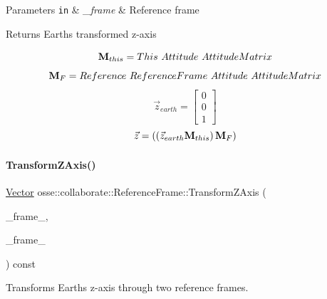 \begin{DoxyParams}[1]{Parameters}
\mbox{\tt in}  & {\em \+\_\+frame} & Reference frame \\
\hline
\end{DoxyParams}
\begin{DoxyReturn}{Returns}
Earth\textquotesingle{}s transformed z-\/axis
\end{DoxyReturn}
\[ {\bf{M}}_{this} = This~Attitude~AttitudeMatrix \] \[ {\bf{M}}_{F} = Reference~ReferenceFrame~Attitude~AttitudeMatrix \] \[ \vec{z}_{earth} = \begin{bmatrix} 0 \\ 0 \\ 1 \end{bmatrix} \] \[ \vec{z} = \left(\left(\vec{z}_{earth}{\bf{M}}_{this}\right){\bf{M}}_{F}\right) \] \mbox{\label{classosse_1_1collaborate_1_1_reference_frame_a2b99f8d49fc9c61b8dc98118469aeb38}} 
\paragraph{\texorpdfstring{Transform\+Z\+Axis()}{TransformZAxis()}\hspace{0.1cm}{\footnotesize\ttfamily [2/2]}}
{\footnotesize\ttfamily \hyperlink{classosse_1_1collaborate_1_1_vector}{Vector} osse\+::collaborate\+::\+Reference\+Frame\+::\+Transform\+Z\+Axis (\begin{DoxyParamCaption}\item[{const \hyperlink{classosse_1_1collaborate_1_1_reference_frame}{Reference\+Frame} \&}]{\+\_\+frame\+\_,  }\item[{const \hyperlink{classosse_1_1collaborate_1_1_reference_frame}{Reference\+Frame} \&}]{\+\_\+frame\+\_ }\end{DoxyParamCaption}) const\hspace{0.3cm}{\ttfamily [private]}}



Transforms Earth\textquotesingle{}s z-\/axis through two reference frames. 


